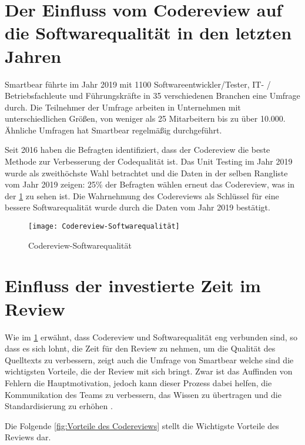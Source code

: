 \section{Der Einfluss vom Codereview auf die Softwarequalität in den letzten Jahren}
\label{sec:Einfluss des Reviews}
Smartbear \cite{smartbear} führte im Jahr 2019 mit 1100 Softwareentwickler/Tester, IT- / Betriebsfachleute und Führungskräfte in 35 verschiedenen Branchen eine Umfrage durch. Die Teilnehmer der Umfrage arbeiten in Unternehmen mit unterschiedlichen Größen, von weniger als 25 Mitarbeitern bis zu über 10.000. Ähnliche Umfragen hat Smartbear regelmäßig durchgeführt.

Seit 2016 haben die Befragten identifiziert, dass der Codereview die beste Methode zur Verbesserung der Codequalität ist. Das Unit Testing im Jahr 2019 wurde als zweithöchste Wahl betrachtet und die Daten in der selben Rangliste vom Jahr 2019 zeigen: 25\% der Befragten wählen erneut das Codereview, was in der \cref{fig:Codereview-Softwarequalität} zu sehen ist. Die Wahrnehmung des Codereviews als Schlüssel für eine bessere Softwarequalität wurde durch die Daten vom Jahr 2019 bestätigt.

\begin{figure}[H]
	\centering
	\texttt{[image: Codereview-Softwarequalität]}
	\caption[Einfluss der Codereview auf die Softwarequalität]{Codereview-Softwarequalität\\ \cite{smartbear}}
	\label{fig:Codereview-Softwarequalität}
\end{figure}

\section{Einfluss der investierte Zeit im Review}
\label{sec:reviewZeit}

Wie im \cref{sec:Einfluss des Reviews} erwähnt, dass Codereview und Softwarequalität eng verbunden sind, so dass es sich lohnt, die Zeit für den Review zu nehmen, um die Qualität des Quelltexts zu verbessern, zeigt auch die Umfrage von Smartbear welche sind die wichtigsten Vorteile, die der Review mit sich bringt. Zwar ist das Auffinden von Fehlern die Hauptmotivation, jedoch kann dieser Prozess dabei helfen, die Kommunikation des Teams zu verbessern, das Wissen zu übertragen und die Standardisierung zu erhöhen \cite{smartbear}. 

Die Folgende \cref{fig:Vorteile des Codereviews} stellt die Wichtigste Vorteile des Reviews dar.

